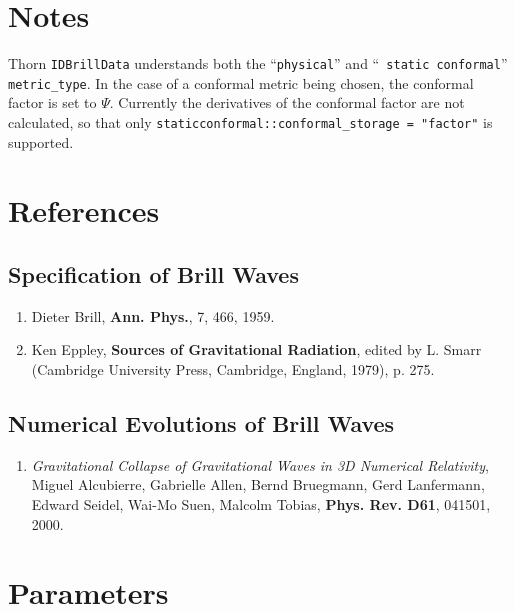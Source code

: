 \documentclass{article}
\begin{document}
\section{Notes}

Thorn {\tt IDBrillData} understands both the ``{\tt physical}'' and ``{\tt
static conformal}'' {\tt metric\_type}. In the case of a conformal
metric being chosen, the conformal factor is set to $\Psi$. Currently
the derivatives of the conformal factor are not calculated, so that
only {\tt staticconformal::conformal\_storage = "factor"} is
supported.

\section{References}

\subsection{Specification of Brill Waves}

\begin{enumerate}

\item Dieter Brill, {\bf Ann. Phys.}, 7, 466, 1959.

\item Ken Eppley, {\bf Sources of Gravitational Radiation}, edited by L. Smarr (Cambridge University Press, 
Cambridge, England, 1979), p. 275.

\end{enumerate}

\subsection{Numerical Evolutions of Brill Waves}

\begin{enumerate}

\item {\it Gravitational Collapse of Gravitational Waves in 3D Numerical Relativity}, 
 Miguel Alcubierre, Gabrielle Allen, Bernd Bruegmann, Gerd Lanfermann, Edward Seidel, Wai-Mo Suen, Malcolm Tobias,
{\bf Phys. Rev. D61}, 041501, 2000.

\end{enumerate}




\section{Parameters} 
\end{document}
